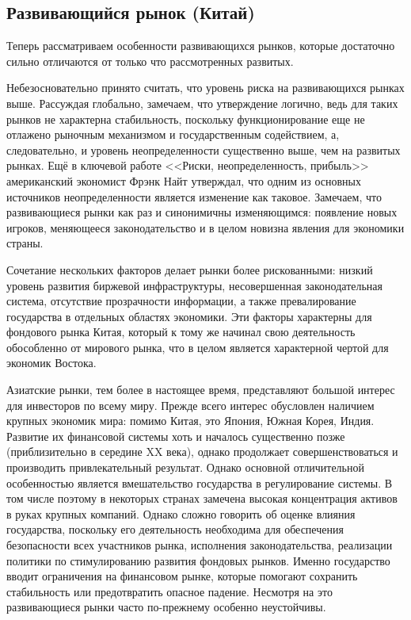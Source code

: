 \subsection{Развивающийся рынок (Китай)}
Теперь рассматриваем особенности развивающихся рынков, которые достаточно сильно отличаются от только что рассмотренных развитых.

Небезосновательно принято считать, что уровень риска на развивающихся рынках выше. Рассуждая глобально, замечаем, что утверждение логично, ведь для таких рынков не характерна стабильность, поскольку функционирование еще не отлажено рыночным механизмом и государственным содействием, а, следовательно, и уровень неопределенности существенно выше, чем на развитых рынках. Ещё в ключевой работе <<Риски, неопределенность, прибыль>> \cite{knight2003risk}  американский экономист Фрэнк Найт утверждал, что одним из основных источников неопределенности является изменение как таковое. Замечаем, что развивающиеся рынки как раз и синонимичны изменяющимся: появление новых игроков, меняющееся законодательство и в целом новизна явления для экономики страны. 

Сочетание нескольких факторов делает рынки более рискованными: низкий уровень развития биржевой инфраструктуры, несовершенная законодательная система, отсутствие прозрачности информации, а также превалирование государства в отдельных областях экономики. Эти факторы характерны для фондового рынка Китая, который к тому же начинал свою деятельность обособленно от мирового рынка, что в целом является характерной чертой для экономик Востока.

Азиатские рынки, тем более в настоящее время, представляют большой интерес для инвесторов по всему миру. Прежде всего интерес обусловлен наличием крупных экономик мира: помимо Китая, это Япония, Южная Корея, Индия. Развитие их финансовой системы хоть и началось существенно позже (приблизительно в середине XX века), однако продолжает совершенствоваться и производить привлекательный результат. Однако основной отличительной особенностью является вмешательство государства в регулирование системы. В том числе поэтому в некоторых странах замечена высокая концентрация активов в руках крупных компаний. Однако сложно говорить об оценке влияния государства, поскольку его деятельность необходима для обеспечения безопасности всех участников рынка, исполнения законодательства, реализации политики по стимулированию развития фондовых рынков. Именно государство вводит ограничения на финансовом рынке, которые помогают сохранить стабильность или предотвратить опасное падение. Несмотря на это развивающиеся рынки часто по-прежнему особенно неустойчивы.

